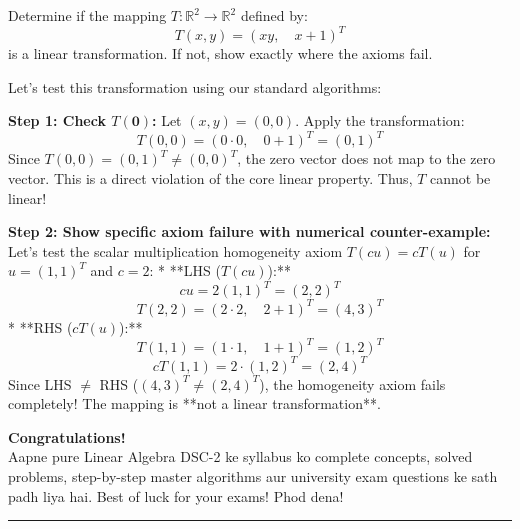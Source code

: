 \documentclass[11pt,a4paper]{article}
\begin{document}
\vspace{0.8cm}

\begin{questionbox}
Determine if the mapping $T: \mathbb{R}^2 \to \mathbb{R}^2$ defined by:
\[ T(x, y) = (xy, \quad x + 1)^T \]
is a linear transformation. If not, show exactly where the axioms fail.
\end{questionbox}

\begin{solutionbox}
Let's test this transformation using our standard algorithms:

\textbf{Step 1: Check $T(\mathbf{0})$:}
Let $(x, y) = (0, 0)$. Apply the transformation:
\[ T(0, 0) = (0 \cdot 0, \quad 0 + 1)^T = (0, 1)^T \]
Since $T(0, 0) = (0, 1)^T \neq (0, 0)^T$, the zero vector does not map to the zero vector.
This is a direct violation of the core linear property. Thus, $T$ cannot be linear!

\textbf{Step 2: Show specific axiom failure with numerical counter-example:}
Let's test the scalar multiplication homogeneity axiom $T(c u) = c T(u)$ for $u = (1, 1)^T$ and $c = 2$:
* **LHS ($T(cu)$):**
  \[ cu = 2(1, 1)^T = (2, 2)^T \]
  \[ T(2, 2) = (2 \cdot 2, \quad 2 + 1)^T = (4, 3)^T \]
* **RHS ($c T(u)$):**
  \[ T(1, 1) = (1 \cdot 1, \quad 1 + 1)^T = (1, 2)^T \]
  \[ c T(1, 1) = 2 \cdot (1, 2)^T = (2, 4)^T \]
Since LHS $\neq$ RHS ($(4, 3)^T \neq (2, 4)^T$), the homogeneity axiom fails completely! The mapping is **not a linear transformation**.
\end{solutionbox}

\newpage
\begin{center}
    \vspace*{4cm}
    {\Large\bfseries\color{RoyalBlue} Congratulations!}\\[0.5cm]
    {\large Aapne pure Linear Algebra DSC-2 ke syllabus ko complete concepts, solved problems, step-by-step master algorithms aur university exam questions ke sath padh liya hai. Best of luck for your exams! Phod dena!}\\[1.0cm]
    \rule{0.5\linewidth}{1.0pt}
\end{center}
\end{document}
